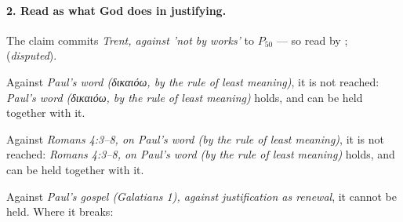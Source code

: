 \documentclass[11pt]{article}
\begin{document}
\paragraph{2. Read as what God does in justifying.} The claim commits \emph{Trent, against 'not by works'} to \(P_{50}\) --- so read by \cite[§22]{lwf-catholic-joint-declaration-2000}; \cite[Trent, Session VI (1547), Decree on Justification, ch. 7]{tanner-decrees-1990} (\emph{disputed}).

Against \emph{Paul's word (δικαιόω, by the rule of least meaning)}, it is not reached: \emph{Paul's word (δικαιόω, by the rule of least meaning)} holds, and can be held together with it.

Against \emph{Romans 4:3–8, on Paul's word (by the rule of least meaning)}, it is not reached: \emph{Romans 4:3–8, on Paul's word (by the rule of least meaning)} holds, and can be held together with it.

Against \emph{Paul's gospel (Galatians 1), against justification as renewal}, it cannot be held. Where it breaks:
\end{document}
